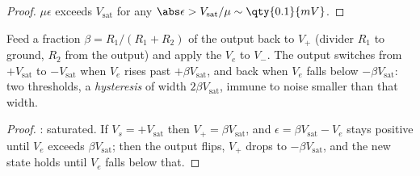 \begin{proof}
$\mu\epsilon$ exceeds $V_{\mathrm{sat}}$ for any $\abs\epsilon >
V_{\mathrm{sat}}/\mu \sim \qty{0.1}{mV}$.
\end{proof}

\begin{proposition}\label{prop:b1:operational-amplifier:schmitt}
Feed a fraction $\beta = R_1/(R_1 + R_2)$ of the output back to $V_+$
(divider $R_1$ to ground, $R_2$ from the output) and apply the 
$V_e$ to $V_-$. The output switches from $+V_{\mathrm{sat}}$ to
$-V_{\mathrm{sat}}$ when $V_e$ rises past $+\beta V_{\mathrm{sat}}$, and
back when $V_e$ falls below $-\beta V_{\mathrm{sat}}$: two thresholds,
a \emph{hysteresis} of width $2\beta V_{\mathrm{sat}}$, immune to noise
smaller than that width.
\end{proposition}

\begin{proof}
: saturated. If $V_s = +V_{\mathrm{sat}}$ then $V_+ =
\beta V_{\mathrm{sat}}$, and $\epsilon = \beta V_{\mathrm{sat}} - V_e$
stays positive until $V_e$ exceeds $\beta V_{\mathrm{sat}}$; then the
output flips, $V_+$ drops to $-\beta V_{\mathrm{sat}}$, and the new state
holds until $V_e$ falls below that.
\end{proof}

